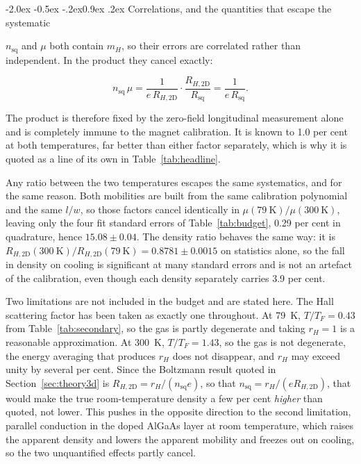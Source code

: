 \documentclass[11pt,a4paper]{article}
\makeatletter
\renewcommand\subsection{\@startsection{subsection}{2}{\z@}%
  {-2.0ex \@plus -0.5ex \@minus -.2ex}{0.9ex \@plus .2ex}%
  {\normalfont\normalsize\bfseries}}
\newcommand{\Rsq}{R_{\mathrm{sq}}}
\newcommand{\Rhtwod}{R_{H,\mathrm{2D}}}
\newcommand{\nsq}{n_{\mathrm{sq}}}
\makeatother
\begin{document}
\subsection{Correlations, and the quantities that escape the systematic}
\label{sec:correlations}

$\nsq$ and $\mu$ both contain $m_H$, so their errors are correlated rather than independent.
In the product they cancel exactly:

\begin{equation}
\nsq\,\mu = \frac{1}{e\,\Rhtwod}\cdot\frac{\Rhtwod}{\Rsq} = \frac{1}{e\,\Rsq} .
\label{eq:product}
\end{equation}

The product is therefore fixed by the zero-field longitudinal measurement alone and is
completely immune to the magnet calibration. It is known to \num{1.0} per cent at both
temperatures, far better than either factor separately, which is why it is quoted as a line
of its own in Table~\ref{tab:headline}.

Any ratio between the two temperatures escapes the same systematics, and for the same reason.
Both mobilities are built from the same calibration polynomial and the same $l/w$, so those
factors cancel identically in $\mu(\qty{79}{\kelvin})/\mu(\qty{300}{\kelvin})$, leaving only
the four fit standard errors of Table~\ref{tab:budget}, \num{0.29} per cent in quadrature,
hence $15.08 \pm 0.04$. The density ratio behaves the same way: it is
$\Rhtwod(\qty{300}{\kelvin})/\Rhtwod(\qty{79}{\kelvin}) = 0.8781 \pm 0.0015$ on statistics
alone, so the fall in density on cooling is significant at many standard errors and is not an
artefact of the calibration, even though each density separately carries \num{3.9} per cent.

Two limitations are not included in the budget and are stated here. The Hall scattering factor
has been taken as exactly one throughout. At \qty{79}{\kelvin}, $T/T_F = 0.43$ from
Table~\ref{tab:secondary}, so the gas is partly degenerate and taking $r_H = 1$ is a
reasonable approximation. At \qty{300}{\kelvin}, $T/T_F = 1.43$, so the gas is not degenerate,
the energy averaging that produces $r_H$ does not disappear, and $r_H$ may exceed unity by
several per cent. Since the Boltzmann result quoted in Section~\ref{sec:theory3d} is
$\Rhtwod = r_H/(\nsq e)$, so that $\nsq = r_H/(e\Rhtwod)$, that would make the true
room-temperature density a few per cent \emph{higher} than quoted, not lower. This pushes in
the opposite direction to the second limitation, parallel conduction in the doped AlGaAs layer
at room temperature, which raises the apparent density and lowers the apparent mobility and
freezes out on cooling, so the two unquantified effects partly cancel.
\end{document}
